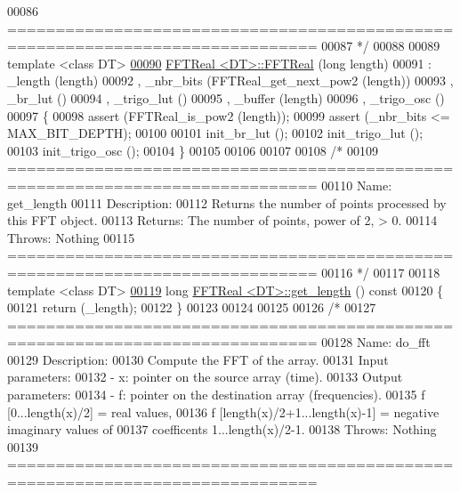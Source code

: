 \begin{DoxyCode}
00086 \textcolor{comment}{==============================================================================}
00087 \textcolor{comment}{*/}
00088 
00089 \textcolor{keyword}{template} <\textcolor{keyword}{class} DT>
\hypertarget{a00096_source_l00090}{}\hyperlink{a00010_a627db4d781235302c3a229fc4d7a10ba}{00090} \hyperlink{a00010}{FFTReal <DT>::FFTReal} (\textcolor{keywordtype}{long} length)
00091 :   \_length (length)
00092 ,   \_nbr\_bits (FFTReal\_get\_next\_pow2 (length))
00093 ,   \_br\_lut ()
00094 ,   \_trigo\_lut ()
00095 ,   \_buffer (length)
00096 ,   \_trigo\_osc ()
00097 \{
00098     assert (FFTReal\_is\_pow2 (length));
00099     assert (\_nbr\_bits <= MAX\_BIT\_DEPTH);
00100 
00101     init\_br\_lut ();
00102     init\_trigo\_lut ();
00103     init\_trigo\_osc ();
00104 \}
00105 
00106 
00107 
00108 \textcolor{comment}{/*}
00109 \textcolor{comment}{==============================================================================}
00110 \textcolor{comment}{Name: get\_length}
00111 \textcolor{comment}{Description:}
00112 \textcolor{comment}{    Returns the number of points processed by this FFT object.}
00113 \textcolor{comment}{Returns: The number of points, power of 2, > 0.}
00114 \textcolor{comment}{Throws: Nothing}
00115 \textcolor{comment}{==============================================================================}
00116 \textcolor{comment}{*/}
00117 
00118 \textcolor{keyword}{template} <\textcolor{keyword}{class} DT>
\hypertarget{a00096_source_l00119}{}\hyperlink{a00010_abdd5b144ba5737c7ad27095d1658c29e}{00119} \textcolor{keywordtype}{long}    \hyperlink{a00010}{FFTReal <DT>::get\_length} () \textcolor{keyword}{const}
00120 \{
00121     \textcolor{keywordflow}{return} (\_length);
00122 \}
00123 
00124 
00125 
00126 \textcolor{comment}{/*}
00127 \textcolor{comment}{==============================================================================}
00128 \textcolor{comment}{Name: do\_fft}
00129 \textcolor{comment}{Description:}
00130 \textcolor{comment}{    Compute the FFT of the array.}
00131 \textcolor{comment}{Input parameters:}
00132 \textcolor{comment}{    - x: pointer on the source array (time).}
00133 \textcolor{comment}{Output parameters:}
00134 \textcolor{comment}{    - f: pointer on the destination array (frequencies).}
00135 \textcolor{comment}{        f [0...length(x)/2] = real values,}
00136 \textcolor{comment}{        f [length(x)/2+1...length(x)-1] = negative imaginary values of}
00137 \textcolor{comment}{        coefficents 1...length(x)/2-1.}
00138 \textcolor{comment}{Throws: Nothing}
00139 \textcolor{comment}{==============================================================================}

\end{DoxyCode}
